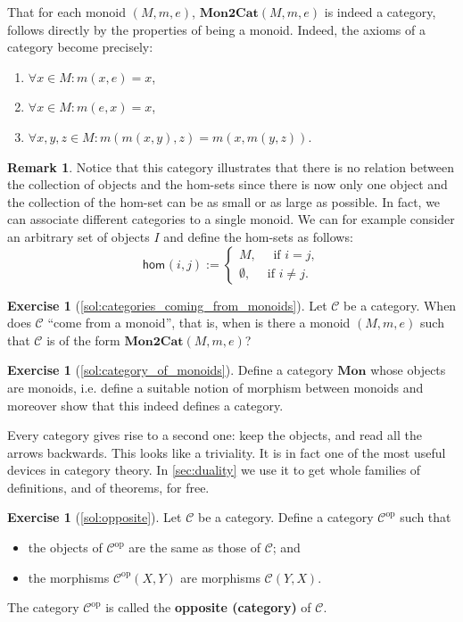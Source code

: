 \documentclass[a4paper,11pt, oneside,titlepage=false]{scrbook}
\theoremstyle{plain}
\theoremstyle{definition}
\newtheorem{rem}[thm]{Remark}
\newtheorem{exer}[thm]{Exercise}
\newcommand{\cfont}[1]{\ensuremath{\mathsf{#1}}}
\newcommand{\Cat}[1]{\mathcal{#1}}
\newcommand{\CC}{\Cat{C}}
\newcommand{\Catb}[1]{\mathbf{#1}}
\newcommand{\MONtoCAT}{\Catb{Mon2Cat}}
\newcommand{\MON}{\Catb{Mon}}
\newcommand{\Hom}[3][]{\cfont{hom}_{#1}(#2,#3)}
\newcommand{\CHom}[3]{{#1}(#2,#3)}
\newcommand{\op}[1]{\ensuremath{{#1}^\text{op}}}
\begin{document}
That for each monoid $(M,m,e)$, $\MONtoCAT(M,m,e)$ is indeed a category, follows directly by the properties of being a monoid. Indeed, the axioms of a category become precisely:
\begin{enumerate}
\item $\forall x\in M: m(x,e)=x$,
\item $\forall x\in M: m(e,x)=x$,
\item $\forall x,y,z\in M: m(m(x,y),z) = m(x,m(y,z))$.
\end{enumerate}

\begin{rem} Notice that this category illustrates that there is no relation between the collection of objects and the hom-sets since there is now only one object and the collection of the hom-set can be as small or as large as possible.
In fact, we can associate different categories to a single monoid. We can for example consider an arbitrary set of objects $I$ and define the hom-sets as follows:
\[
\Hom{i}{j} :=
\begin{cases}
M ,\quad \text{ if } i=j,\\
\emptyset, \quad \text{ if } i\not=j.
\end{cases}
\]
\end{rem}

\begin{exer}[\cref{sol:categories_coming_from_monoids}]\label{exer:categories_coming_from_monoids}
  Let $\CC$ be a category. When does $\CC$ ``come from a monoid'', that is, when is there a monoid $(M,m,e)$ such that $\CC$ is of the form $\MONtoCAT(M,m,e)$?
\end{exer}

\begin{exer}[\cref{sol:category_of_monoids}]\label{exer:category_of_monoids}
  Define a category $\MON$ whose objects are monoids, i.e. define a suitable notion of morphism between monoids and moreover show that this indeed defines a category.
\end{exer}

Every category gives rise to a second one: keep the objects, and read all the
arrows backwards.
This looks like a triviality.
It is in fact one of the most useful devices in category theory.
In \cref{sec:duality} we use it to get whole families of definitions, and of
theorems, for free.

\begin{exer}[\cref{sol:opposite}]\label{exer:opposite}
  Let $\CC$ be a category. Define a category $\op\CC$ such that
  \begin{itemize}
  \item the objects of $\op\CC$ are the same as those of $\CC$; and
  \item the morphisms $\CHom {\op\CC} X Y$ are morphisms $\CHom \CC Y X$.
  \end{itemize}
  The category $\op\CC$ is called the \textbf{opposite (category)} of $\CC$.
\end{exer}
\end{document}
